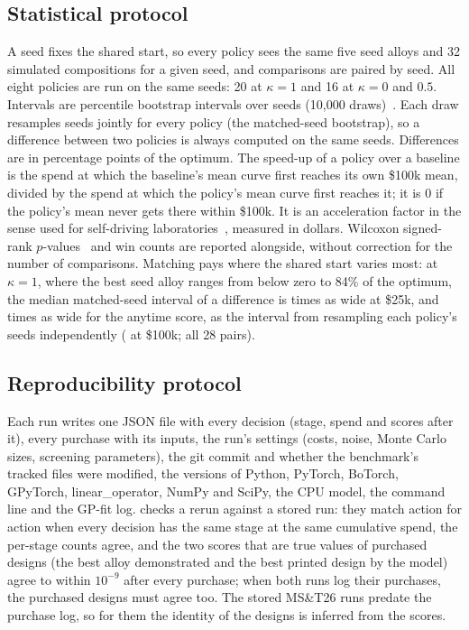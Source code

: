 \documentclass[11pt]{article}
\begin{document}
\subsection*{Statistical protocol}

A seed fixes the shared start, so every policy sees the same five seed alloys
and 32 simulated compositions for a given seed, and comparisons are paired by
seed. All eight policies are run on the same seeds: 20 at $\kappa=1$ and 16 at
$\kappa=0$ and $0.5$. Intervals are percentile bootstrap intervals over seeds
(10,000 draws)~\cite{efron1993}. Each draw resamples seeds jointly for every
policy (the matched-seed bootstrap), so a difference between two policies is
always computed on the same seeds. Differences are in percentage points of the
optimum. The speed-up of a policy over a baseline is the spend at which the
baseline's mean curve first reaches its own \$100k mean, divided by the spend at
which the policy's mean curve first reaches it; it is 0 if the policy's mean
never gets there within \$100k. It is an acceleration factor in the sense used
for self-driving laboratories~\cite{tom2024}, measured in dollars. Wilcoxon signed-rank
$p$-values~\cite{wilcoxon1945} and win counts are reported alongside, without
correction for the number of comparisons. Matching pays where the shared start
varies most: at $\kappa=1$, where the best seed alloy ranges from below zero to
84\% of the optimum, the median matched-seed interval of a difference is
 times as wide at \$25k, and 
times as wide for the anytime score, as the interval from resampling each
policy's seeds independently ( at \$100k; all 28 pairs).

\subsection*{Reproducibility protocol}

Each run writes one JSON file with every decision (stage, spend and scores
after it), every purchase with its inputs, the run's settings (costs, noise,
Monte Carlo sizes, screening parameters), the git commit and whether the
benchmark's tracked files were modified, the versions of Python, PyTorch,
BoTorch, GPyTorch, linear\_operator, NumPy and SciPy, the CPU model, the
command line and the GP-fit log.  checks a rerun against
a stored run: they match action for action when every decision has the same
stage at the same cumulative spend, the per-stage counts agree, and the two
scores that are true values of purchased designs (the best alloy demonstrated
and the best printed design by the model) agree to within $10^{-9}$ after every
purchase; when both runs log their purchases, the purchased designs must agree
too. The stored MS\&T26 runs predate the purchase log, so for them the identity
of the designs is inferred from the scores.
\end{document}

